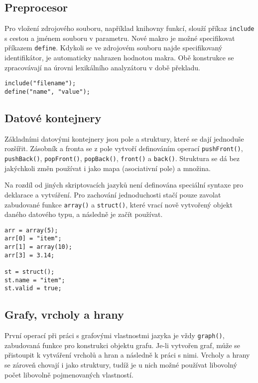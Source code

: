 \documentclass[11pt,twoside,a4paper]{book}
\begin{document}
\subsection{Preprocesor}

Pro vložení zdrojového souboru, například knihovny funkcí, slouží příkaz \texttt{include} s cestou a jménem souboru v parametru. Nové makro je možné specifikovat příkazem \texttt{define}. Kdykoli se ve zdrojovém souboru najde specifikovaný identifikátor, je automaticky nahrazen hodnotou makra. Obě konstrukce se zpracovávají na úrovni lexikálního analyzátoru v době překladu.

\begin{verbatim}
include("filename");
define("name", "value");
\end{verbatim}


\subsection{Datové kontejnery}

Základními datovými kontejnery jsou pole a struktury, které se dají jednoduše rozšířit. Zásobník a fronta se z pole vytvoří definováním operací \texttt{pushFront()}, \texttt{push\-Back()}, \texttt{popFront()}, \texttt{popBack()}, \texttt{front()} a \texttt{back()}. Struktura se dá bez jakýchkoli změn po\-u\-ží\-vat i jako mapa (asociativní pole) a množina.

Na rozdíl od jiných skriptovacích jazyků není definována speciální syntaxe pro deklarace a vytváření. Pro zachování jednoduchosti stačí pouze zavolat zabudované funkce \texttt{array()} a \texttt{struct()}, které vrací nově vytvořený objekt daného datového typu, a ná\-sled\-ně je začít používat.

\begin{verbatim}
arr = array(5);
arr[0] = "item";
arr[1] = array(10);
arr[3] = 3.14;

st = struct();
st.name = "item";
st.valid = true;
\end{verbatim}


\subsection{Grafy, vrcholy a hrany}

První operací při práci s grafovými vlastnostmi jazyka je vždy \texttt{graph()}, zabudovaná funkce pro konstrukci objektu grafu. Je-li vytvořen graf, může se přistoupit k vytváření vrcholů a hran a následně k práci s nimi. Vrcholy a hrany se zároveň chovají i jako struktury, tudíž je u nich možné používat libovolný počet libovolně pojmenovaných vlastností.
\end{document}
